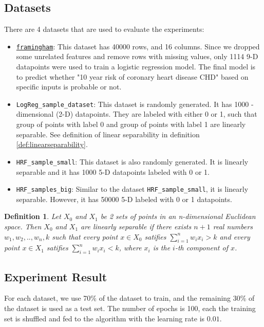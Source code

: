     \subsection{Datasets}
    There are 4 datasets that are used to evaluate the experiments:
    \begin{itemize}[nosep]
        \item \hyperlink{https://www.kaggle.com/dileep070/heart-disease-prediction-using-logistic-regression}{\texttt{framingham}}: This dataset has 40000 rows, and 16 columns. Since we dropped some unrelated features and remove rows with missing values, only 1114 9-D datapoints were used to train a logistic regression model. The final model is to predict whether "10 year risk of coronary heart disease CHD" based on specific inputs is probable or not.
        \item \texttt{LogReg\_sample\_dataset}: This dataset is randomly generated. It has 1000 -dimensional (2-D) datapoints. They are labeled with either 0 or 1, such that group of points with label 0 and group of points with label 1 are linearly separable. See definition of linear separability in definition \ref{def:linearseparability}.
        \item \texttt{HRF\_sample\_small}: This dataset is also randomly generated. It is linearly separable and it has 1000 5-D datapoints labeled with 0 or 1.
        \item \texttt{HRF\_samples\_big}: Similar to the dataset \texttt{HRF\_sample\_small}, it is linearly separable. However, it has 50000 5-D labeled with 0 or 1 datapoints.
    \end{itemize}
    \newtheorem{definition}{Definition}
    \begin{definition}
        Let $X_0$ and $X_1$ be 2 sets of points in an n-dimensional Euclidean space. Then $X_0$ and $X_1$ are \textit{linearly separable} if there exists $n+1$ real numbers $w_1, w_2,.., w_n, k$ such that every point $x \in X_0$ satifies $\sum_{i=1}^{n}w_ix_i > k$ and every point $x \in X_1$ satifies $\sum_{i=1}^{n}w_ix_i < k$, where $x_i$ is the $i$-th component of $x$.
        \caption{Definition of linear separability\cite{enwiki:1042160240}}
        \label{def:linearseparability}
    \end{definition}
    \subsection{Experiment Result}
    For each dataset, we use 70\% of the dataset to train, and the remaining 30\% of the dataset is used as a test set. The number of epochs is 100, each the training set is shuffled and fed to the algorithm with the learning rate is $0.01$.
    

